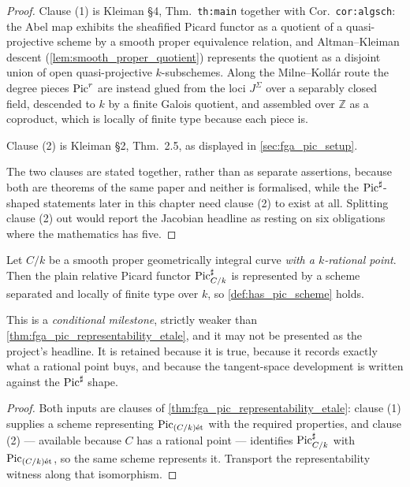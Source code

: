 \begin{proof}
  Clause (1) is Kleiman \S 4, Thm.~\texttt{th:main} together with Cor.\
  \texttt{cor:algsch}: the Abel map exhibits the sheafified Picard functor as a
  quotient of a quasi-projective scheme by a smooth proper equivalence
  relation, and Altman--Kleiman descent (\cref{lem:smooth_proper_quotient})
  represents the quotient as a disjoint union of open quasi-projective
  \(k\)-subschemes. Along the Milne--Koll\'ar route the degree pieces
  \(\operatorname{Pic}^r\) are instead glued from the loci \(J^\Sigma\) over a separably
  closed field, descended to \(k\) by a finite Galois quotient, and assembled
  over \(\mathbb{Z}\) as a coproduct, which is locally of finite type because
  each piece is.

  Clause (2) is Kleiman \S 2, Thm.~2.5, as displayed in
  \cref{sec:fga_pic_setup}.

  The two clauses are stated together, rather than as separate assertions,
  because both are theorems of the same paper and neither is formalised, while
  the \(\operatorname{Pic}^\sharp\)-shaped statements later in this chapter need clause (2)
  to exist at all. Splitting clause (2) out would report the Jacobian headline
  as resting on six obligations where the mathematics has five.
\end{proof}

\begin{definition}[Picard scheme of a pointed curve]\leanok
  \label{def:inst_has_pic_scheme}
  Let \(C/k\) be a smooth proper geometrically integral curve \emph{with a
  \(k\)-rational point}. Then the plain relative Picard functor
  \(\operatorname{Pic}^\sharp_{C/k}\) is represented by a scheme separated and locally of
  finite type over \(k\), so \cref{def:has_pic_scheme} holds.

  This is a \emph{conditional milestone}, strictly weaker than
  \cref{thm:fga_pic_representability_etale}, and it may not be presented as the
  project's headline. It is retained because it is true, because it records
  exactly what a rational point buys, and because the tangent-space development
  is written against the \(\operatorname{Pic}^\sharp\) shape.
\end{definition}

\begin{proof}\leanok
  Both inputs are clauses of \cref{thm:fga_pic_representability_etale}: clause
  (1) supplies a scheme representing \(\operatorname{Pic}_{(C/k)\mathrm{\acute{e}t}}\) with the required
  properties, and clause (2) --- available because \(C\) has a rational point
  --- identifies \(\operatorname{Pic}^\sharp_{C/k}\) with \(\operatorname{Pic}_{(C/k)\mathrm{\acute{e}t}}\), so the same
  scheme represents it. Transport the representability witness along that
  isomorphism.
\end{proof}

